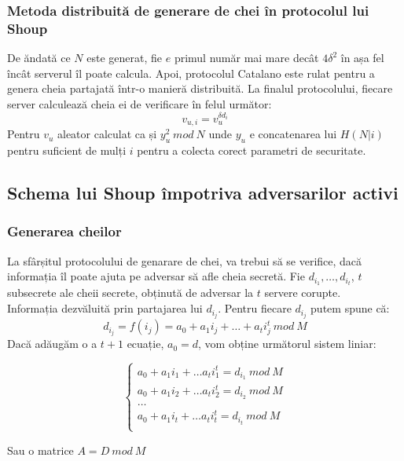 \documentclass[12pt, oneside]{book}
\begin{document}
\subsubsection{Metoda distribuită de generare de chei în protocolul lui Shoup}
De ăndată ce $N$ este generat, fie $e$ primul număr mai mare decât $4 \delta^{2}$  în așa fel încât serverul îl poate calcula. Apoi, protocolul Catalano \cite{catalano} este rulat pentru a genera cheia partajată într-o manieră distribuită. La finalul protocolului, fiecare server calculează cheia ei de verificare în felul următor:
$$ v_{u,i} = v_{u}^{\delta d_i}$$
Pentru $v_u$ aleator calculat ca și $y_{u}^{2} \ mod \ N$ unde $y_u$ e concatenarea lui $H(N|i)$ pentru suficient de mulți $i$ pentru a colecta corect parametri de securitate.

\subsection{Schema lui Shoup împotriva adversarilor activi}
\subsubsection{Generarea cheilor}
La sfârșitul protocolului de genarare de chei, va trebui să se verifice, dacă informația îl poate ajuta pe adversar să afle cheia secretă. Fie $d_{i_1}, \dots ,d_{i_t}$, $t$ subsecrete ale cheii secrete, obținută de adversar la $t$ servere corupte. \\
Informația dezvăluită prin partajarea lui $d_{i_j}$. Pentru fiecare $d_{i_j}$ putem spune că: 
$$d_{i_j} = f(i_j) = a_0 + a_1i_j +  \dots  + a_t i_{j}^{t} \ mod \ M       $$
Dacă adăugăm o a $t+1$ ecuație, $a_0=d$, vom obține următorul sistem liniar:



\[
\left\{ 
\begin{array}{c}
a_0 + a_1 i_1 +  \dots  a_t i_{1}^{t}  = d_{i_1} \ mod \ M \\ 
a_0 + a_1 i_2 +  \dots  a_t i_{2}^{t}  = d_{i_2} \ mod \ M \\ 
 \dots  \\
a_0 + a_1 i_t +  \dots  a_t i_{t}^{t}  = d_{i_t} \ mod \ M \\
\end{array}
\right. 
\]

Sau o matrice $A = D \ mod \ M$
\end{document}
